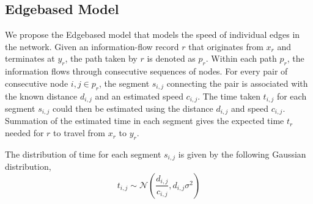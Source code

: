 \documentclass[conference]{IEEEtran.1.8}
\begin{document}
\subsection{Edgebased Model}

We propose the Edgebased model that models the speed of individual edges in the network. Given an information-flow record $r$ that originates from $x_r$ and terminates at $y_r$, the path taken by $r$ is denoted as $p_r$. Within each path $p_r$, the information flows through consecutive sequences of nodes. For every pair of consecutive node $i,j \in p_r$, the segment $s_{i,j}$ connecting the pair is associated with the known distance $d_{i,j}$ and an estimated speed $c_{i,j}$. The time taken $t_{i,j}$ for each segment $s_{i,j}$ could then be estimated using the distance $d_{i,j}$ and speed $c_{i,j}$. Summation of the estimated time in each segment gives the expected time $t_r$ needed for $r$ to travel from $x_r$ to $y_r$.

The distribution of time for each segment $s_{i,j}$ is given by the following Gaussian distribution,
\[ t_{i,j} \sim \mathcal{N} \left( \frac{d_{i,j}}{c_{i,j}}, d_{i,j} \sigma^2 \right) \]
\end{document}
